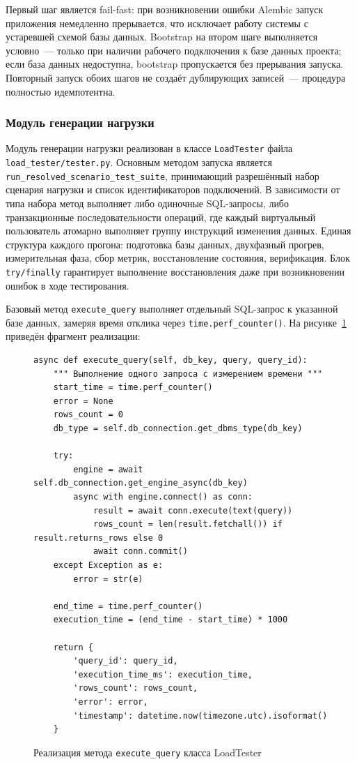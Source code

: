 Первый шаг является fail-fast: при возникновении ошибки Alembic запуск приложения немедленно прерывается, что исключает работу системы с устаревшей схемой базы данных. Bootstrap на втором шаге выполняется условно~--- только при наличии рабочего подключения к базе данных проекта; если база данных недоступна, bootstrap пропускается без прерывания запуска. Повторный запуск обоих шагов не создаёт дублирующих записей~--- процедура полностью идемпотентна.

\subsubsection{Модуль генерации нагрузки}

Модуль генерации нагрузки реализован в классе \texttt{LoadTester} файла \texttt{load\_tester/tester.py}. Основным методом запуска является \texttt{run\_resolved\_scenario\_test\_suite}, принимающий разрешённый набор сценария нагрузки и список идентификаторов подключений. В зависимости от типа набора метод выполняет либо одиночные SQL-запросы, либо транзакционные последовательности операций, где каждый виртуальный пользователь атомарно выполняет группу инструкций изменения данных. Единая структура каждого прогона: подготовка базы данных, двухфазный прогрев, измерительная фаза, сбор метрик, восстановление состояния, верификация. Блок \texttt{try/finally} гарантирует выполнение восстановления даже при возникновении ошибок в ходе тестирования.

Базовый метод \texttt{execute\_query} выполняет отдельный SQL-запрос к указанной базе данных, замеряя время отклика через \texttt{time.perf\_counter()}. На рисунке~\ref{lst:execute_query} приведён фрагмент реализации:

\begin{figure}
    \begin{minipage}{\linewidth}
\begin{lstlisting}
async def execute_query(self, db_key, query, query_id):
    """ Выполнение одного запроса с измерением времени """
    start_time = time.perf_counter()
    error = None
    rows_count = 0
    db_type = self.db_connection.get_dbms_type(db_key)

    try:
        engine = await self.db_connection.get_engine_async(db_key)
        async with engine.connect() as conn:
            result = await conn.execute(text(query))
            rows_count = len(result.fetchall()) if result.returns_rows else 0
            await conn.commit()
    except Exception as e:
        error = str(e)

    end_time = time.perf_counter()
    execution_time = (end_time - start_time) * 1000

    return {
        'query_id': query_id,
        'execution_time_ms': execution_time,
        'rows_count': rows_count,
        'error': error,
        'timestamp': datetime.now(timezone.utc).isoformat()
    }
\end{lstlisting}
    \end{minipage}
    \caption{Реализация метода \texttt{execute\_query} класса LoadTester}
    \label{lst:execute_query}
\end{figure}

